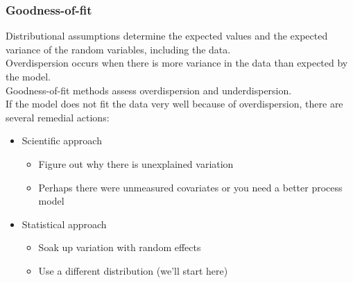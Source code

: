 \documentclass[color=usenames,dvipsnames]{beamer}\usepackage[]{graphicx}\usepackage[]{xcolor}
\begin{document}
\begin{frame}
  \frametitle{Goodness-of-fit}
  \small
  Distributional assumptions determine the expected values
  \alert{and the expected variance} of the random variables, including
  the data. \\  
  \pause
  \vfill
  Overdispersion occurs when there is more variance in the data than
  expected by the model. \\
  \pause
  \vfill
  Goodness-of-fit methods assess overdispersion and underdispersion. \\
  \pause
  \vfill
  If the model does not fit the data very well because of
  overdispersion, there are several remedial actions:
  \begin{itemize}
  \item<5-> Scientific approach
    \begin{itemize}
       \item Figure out why there is unexplained variation
       \item Perhaps there were unmeasured covariates or you need a
         better process model
    \end{itemize}
  \item<6-> Statistical approach
    \begin{itemize}
      \item Soak up variation with random effects
      \item Use a different distribution (we'll start here)
    \end{itemize}
  \end{itemize}
\end{frame}
\end{document}
